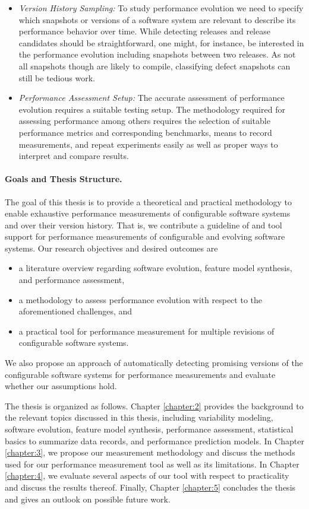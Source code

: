 \begin{itemize}
\item \emph{Version History Sampling:} To study performance evolution we need to
specify which snapshots or versions of a software system are relevant to
describe its performance behavior over time. While detecting releases and release candidates should be straightforward, one might, for instance, be interested in the performance evolution including snapshots
between two releases. As not all snapshots though are likely to compile,
classifying defect snapshots can still be tedious work.
\item \emph{Performance Assessment Setup:} The accurate assessment of
performance evolution requires a suitable testing setup. The methodology required for assessing performance
among others requires the selection of suitable performance metrics and
corresponding benchmarks, means to record measurements, and repeat experiments
easily as well as proper ways to interpret and compare results.
\end{itemize}

\paragraph{Goals and Thesis Structure.}
The goal of this thesis is to provide a theoretical and practical methodology to enable
exhaustive performance measurements of configurable software systems and over
their version history. That is, we contribute a guideline of and tool support
for performance measurements of configurable and evolving software systems. Our
research objectives and desired outcomes are

\begin{itemize}
\item a literature overview regarding software evolution, feature model
synthesis, and performance assessment,
\item a methodology to assess performance evolution with respect to the
aforementioned challenges, and
\item a practical tool for performance measurement for multiple revisions of
configurable software systems.
\end{itemize}

We also propose an approach of automatically detecting promising versions of the
configurable software systems for performance measurements and evaluate whether
our assumptions hold. 

{
\color{red}
The thesis is organized as follows. Chapter
\ref{chapter:2} provides the background to the relevant topics discussed in this thesis, including variability modeling, software evolution, feature model synthesis, performance
assessment, statistical basics to summarize data records, and performance
prediction models.
In Chapter \ref{chapter:3}, we propose our measurement methodology and discuss
the methods used for our performance measurement tool as well as its
limitations. In Chapter \ref{chapter:4}, we evaluate several aspects of our
tool with respect to practicality and discuss the results thereof. Finally,
Chapter \ref{chapter:5} concludes the thesis and gives an outlook on possible
future work.
}

